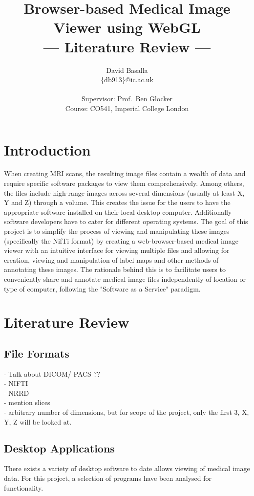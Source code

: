 \documentclass[a4paper,11pt,titlepage]{article}
\title{Browser-based Medical Image Viewer using WebGL \\\Large{--- Literature Review ---}}
\author{David Basalla\\
       \{db913\}@ic.ac.uk\\ \\
       \small{Supervisor: Prof.\ Ben Glocker}\\
       \small{Course: CO541, Imperial College London}
}
\begin{document}
\maketitle

\section{Introduction}
When creating MRI scans, the resulting image files contain a wealth of data and require specific software packages to view them comprehensively. Among others, the files include high-range images across several dimensions (usually at least X, Y and Z) through a volume. This creates the issue for the users to have the appropriate software installed on their local desktop computer. Additionally software developers have to cater for different operating systems. The goal of this project is to simplify the process of viewing and manipulating these images (specifically the NifTi format) by creating a web-browser-based medical image viewer with an intuitive interface for viewing multiple files and allowing for creation, viewing and manipulation of label maps and other methods of annotating these images. The rationale behind this is to facilitate users to conveniently share and annotate medical image files independently of location or type of computer, following the "Software as a Service" paradigm.

\section{Literature Review}
\subsection{File Formats}
- Talk about DICOM/ PACS ?? \\
- NIFTI\\
- NRRD\\
- mention slices\\
- arbitrary number of dimensions, but for scope of the project, only the first 3, X, Y, Z will be looked at.

\subsection{Desktop Applications}

There exists a variety of desktop software to date allows viewing of medical image data. For this project, a selection of programs have been analysed for functionality.\\
\end{document}

